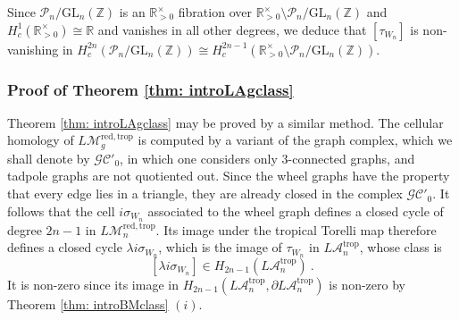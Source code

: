 \documentclass[10pt]{amsart}
\newcommand{\RR}{{\mathbb R}}
\newcommand{\ZZ}{{\mathbb Z}}
\theoremstyle{plain}
\newcommand{\LM}{L\mathcal{M}}
\newcommand{\LA}{L\mathcal{A}}
\newcommand{\GL}{\mathrm{GL}}
\newcommand{\trop}{\mathrm{trop}}
\newcommand{\GC}{\mathcal{GC}}
\newcommand{\0}{\color{blue}{\mathsf{0}}}
\begin{document}
Since $ \mathcal{P}_n /\GL_n(\ZZ)$ is an $\RR^{\times}_{>0}$ fibration over $\RR^{\times}_{>0} \setminus \mathcal{P}_n /\GL_n(\ZZ)$ and $H_c^{1}(\RR^{\times}_{>0}) \cong \RR$ and vanishes in all other degrees,  we deduce that $[\tau_{W_n}]$ is non-vanishing in $H^{2n}_c(\mathcal{P}_n /\GL_n(\ZZ)) \cong      H^{2n-1}_c(\RR^{\times}_{>0} \setminus \mathcal{P}_n /\GL_n(\ZZ))$. 

\subsubsection{Proof of Theorem \ref{thm: introLAgclass}}
Theorem  \ref{thm: introLAgclass} may be proved by a similar method. The cellular homology of $\LM_g^{\mathrm{red}, \trop}$ is computed by a variant of the graph complex, which we shall denote by $\GC'_0$, in which one considers only 3-connected graphs, and tadpole graphs are not quotiented out. Since the wheel graphs have the property that every edge lies in a triangle,  they are already closed in the complex $\GC'_0.$
 It follows   that the cell $i \sigma_{W_n}$  associated to the wheel graph defines a  closed cycle of degree $2n-1$ in  $\LM_n^{\mathrm{red}, \trop}$. 
Its image under the tropical Torelli map therefore defines a closed cycle  $\lambda i\sigma_{W_n}$, which is the image of $\tau_{W_n}$ in $\LA_n^{\trop}$, whose class is
\[ [\lambda i \sigma_{W_n}] \in H_{2n-1} (\LA_n^{\trop}) \ .  \]
It is non-zero since its image  in  $H_{2n-1} (\LA_n^{\trop},\partial \LA_n^{\trop})$ is   non-zero by Theorem  \ref{thm: introBMclass}  $(i)$.
\end{document}
